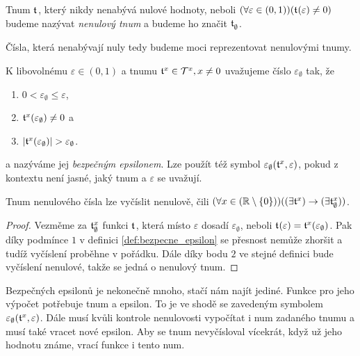 \begin{definition}
Tnum $\mathfrak{t}^{}$, který nikdy nenabývá nulové hodnoty, neboli $(\forall \varepsilon \in (0,1))(\mathfrak{t}^{}(\varepsilon) \neq 0)$ budeme nazývat \textit{nenulový tnum} a budeme ho značit $\mathfrak{t}^{}_\emptyset$.
\end{definition}

Čísla, která nenabývají nuly tedy budeme moci reprezentovat nenulovými tnumy.

\begin{definition}\label{def:bezpecne_epsilon}
K libovolnému $\varepsilon\in (0,1)$ a tnumu $\mathfrak{t}^{x}\in\mathcal{T}^{x}, x\neq 0$ uvažujeme číslo $\varepsilon_\emptyset$ tak, že
\begin{enumerate}
\item{$0<\varepsilon_\emptyset\leq\varepsilon$},
\item{$\mathfrak{t}^{x}(\varepsilon_\emptyset) \neq 0$} a
\item{$|\mathfrak{t}^{x}(\varepsilon_\emptyset)| > \varepsilon_\emptyset$}.
\end{enumerate}
a nazýváme jej \textit{bezpečným epsilonem}. Lze použít též symbol $\varepsilon_\emptyset(\mathfrak{t}^{x},\varepsilon)$, pokud z kontextu není jasné, jaký tnum a $\varepsilon$ se uvažují.
\end{definition}

\begin{lemma}\label{vet:nenul}
Tnum nenulového čísla lze vyčíslit nenulově, čili $(\forall x \in(\mathbb{R}\setminus\{0\}))((\exists \mathfrak{t}^{x}) \rightarrow (\exists \mathfrak{t}^{x}_\emptyset))$. 
\begin{proof}
Vezměme za $\mathfrak{t}^{x}_\emptyset$ funkci $\mathfrak{t}^{}$, která místo $\varepsilon$ dosadí $\varepsilon_\emptyset$, neboli $\mathfrak{t}^{}(\varepsilon) = \mathfrak{t}^{x}(\varepsilon_\emptyset)$. Pak díky podmínce $1$ v definici \ref{def:bezpecne_epsilon} se přesnost nemůže zhoršit a tudíž vyčíslení proběhne v pořádku. Dále díky bodu $2$ ve stejné definici bude vyčíslení nenulové, takže se jedná o nenulový tnum.
\end{proof}
\end{lemma}

Bezpečných epsilonů je nekonečně mnoho, stačí nám najít jediné. Funkce pro jeho výpočet potřebuje tnum a epsilon. To je ve shodě se zavedeným symbolem $\varepsilon_\emptyset(\mathfrak{t}^{x}, \varepsilon)$. Dále musí kvůli kontrole nenulovosti vypočítat i num zadaného tnumu a musí také vracet nové epsilon. Aby se tnum nevyčísloval vícekrát, když už jeho hodnotu známe, vrací funkce i tento num.

